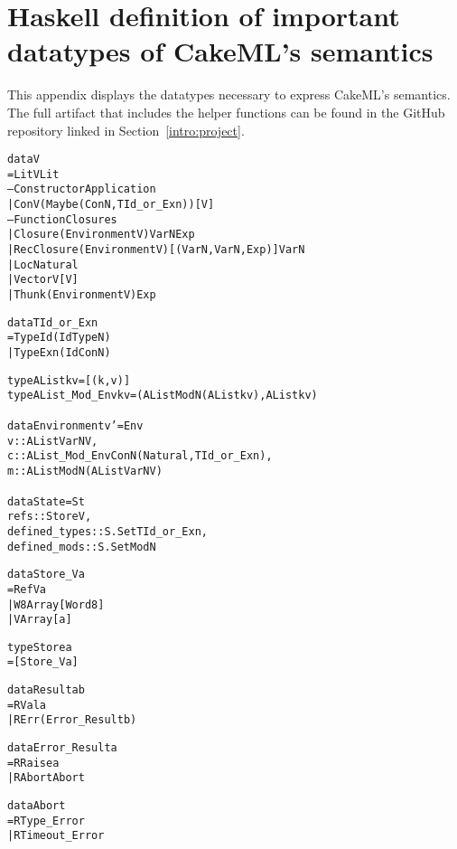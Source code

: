 \chapter{Haskell definition of important datatypes of CakeML's semantics}
\label{app:semprim}

This appendix displays the datatypes necessary to express CakeML's semantics.
The full artifact that includes the helper functions can be found in the GitHub
repository linked in Section~\ref{intro:project}.

\begin{alltt}
data V
  = LitV Lit
  -- Constructor Application
  | ConV (Maybe (ConN, TId_or_Exn)) [V]
  -- Function Closures
  | Closure (Environment V) VarN Exp
  | RecClosure (Environment V) [(VarN, VarN, Exp)] VarN
  | Loc Natural
  | VectorV [V]
  | Thunk (Environment V) Exp

data TId_or_Exn
  = TypeId (Id TypeN)
  | TypeExn (Id ConN)

type AList k v = [(k, v)]
type AList_Mod_Env k v = (AList ModN (AList k v), AList k v)

data Environment v' = Env {
  v :: AList VarN V,
  c :: AList_Mod_Env ConN (Natural, TId_or_Exn),
  m :: AList ModN (AList VarN V)
}

data State = St {
  refs          :: Store V,
  defined_types :: S.Set TId_or_Exn,
  defined_mods  :: S.Set ModN
}

data Store_V a
  = RefV a
  | W8Array [Word8]
  | VArray [a]

type Store a
  = [Store_V a]

data Result a b
  = RVal a
  | RErr (Error_Result b)

data Error_Result a
  = RRaise a
  | RAbort Abort

data Abort
  = RType_Error
  | RTimeout_Error
\end{alltt}
